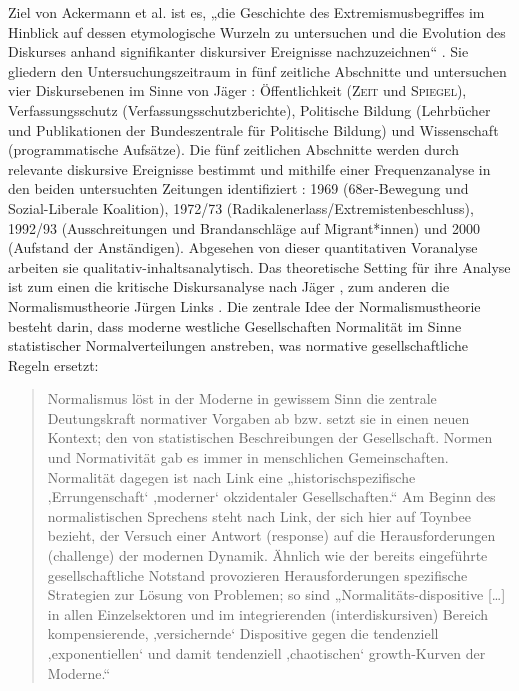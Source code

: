 Ziel von Ackermann et al. ist es, „die Geschichte des Extremismusbegriffes im Hinblick auf dessen etymologische Wurzeln zu untersuchen und die Evolution des Diskurses anhand signifikanter diskursiver Ereignisse nachzuzeichnen`` \autocite*[72]{ackermannMetamorphosenExtremismusbegriffesDiskursanalytische2015}. Sie gliedern den Untersuchungszeitraum in fünf zeitliche Abschnitte und untersuchen vier Diskursebenen im Sinne von Jäger \autocite*{jagerKonigswegGibtEs1999}: Öffentlichkeit (\textsc{Zeit} und \textsc{Spiegel}), Verfassungsschutz (Verfassungsschutzberichte), Politische Bildung (Lehrbücher und Publikationen der Bundeszentrale für Politische Bildung) und Wissenschaft (programmatische Aufsätze). Die fünf zeitlichen Abschnitte werden durch relevante diskursive Ereignisse bestimmt und mithilfe einer Frequenzanalyse in den beiden untersuchten Zeitungen identifiziert \autocite[88-91]{ackermannMetamorphosenExtremismusbegriffesDiskursanalytische2015}: 1969 (68er-Bewegung und Sozial-Liberale Koalition), 1972{\slash}73 (Radikalenerlass{\slash}Extremistenbeschluss), 1992{\slash}93 (Ausschreitungen und Brandanschläge auf Migrant*innen) und 2000 (Aufstand der Anständigen). Abgesehen von dieser quantitativen Voranalyse arbeiten sie qualitativ-inhaltsanalytisch. Das theoretische Setting für ihre Analyse ist zum einen die kritische Diskursanalyse nach Jäger \autocite*{jagerKritischeDiskursanalyseEinfuhrung2012}, zum anderen die Normalismustheorie Jürgen Links \autocite*{linkGrenzenFlexiblenNormalismus1994}. Die zentrale Idee der Normalismustheorie besteht darin, dass moderne westliche Gesellschaften Normalität im Sinne statistischer Normalverteilungen anstreben, was normative gesellschaftliche Regeln ersetzt:

\begin{quote}
Normalismus löst in der Moderne in gewissem Sinn die zentrale Deutungskraft normativer Vorgaben ab bzw. setzt sie in einen neuen Kontext; den von statistischen Beschreibungen der Gesellschaft. Normen und Normativität gab es immer in menschlichen Gemeinschaften. Normalität dagegen ist nach Link eine „historischspezifische ‚Errungenschaft` ‚moderner` okzidentaler Gesellschaften.`` Am Beginn des normalistischen Sprechens steht nach Link, der sich hier auf Toynbee bezieht, der Versuch einer Antwort (response) auf die Herausforderungen (challenge) der modernen Dynamik. Ähnlich wie der bereits eingeführte gesellschaftliche Notstand provozieren Herausforderungen spezifische Strategien zur Lösung von Problemen; so sind „Normalitäts-dispositive {[}\ldots{]} in allen Einzelsektoren und im integrierenden (interdiskursiven) Bereich kompensierende, ‚versichernde` Dispositive gegen die tendenziell ‚exponentiellen` und damit tendenziell ‚chaotischen` growth-Kurven der Moderne.`` \autocite[84 unter Bezug auf Link 1994]{ackermannMetamorphosenExtremismusbegriffesDiskursanalytische2015}
\end{quote}

